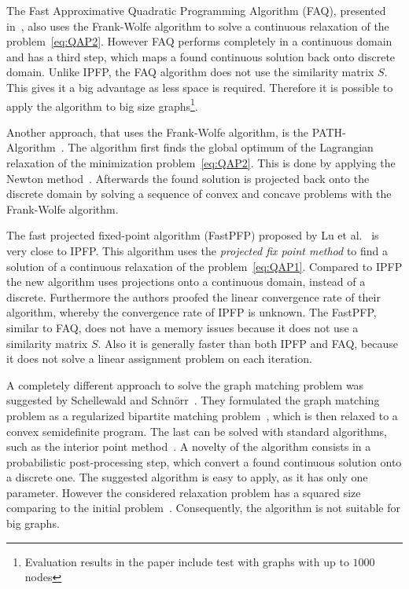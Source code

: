 The Fast Approximative Quadratic Programming Algorithm (FAQ), presented in~\cite{Vogelstein_BrainGraphs}, also uses the Frank-Wolfe algorithm to solve a continuous relaxation of the problem~\eqref{eq:QAP2}. However FAQ performs completely in a continuous domain and has a third step, which maps a found continuous solution back onto discrete domain. Unlike IPFP, the FAQ algorithm does not use the similarity matrix $S$. This gives it a big advantage as less space is required. Therefore it is possible to apply the algorithm to big size graphs\footnote{Evaluation results in the paper include test with graphs with up to $1000$ nodes}. 

Another approach, that uses the Frank-Wolfe algorithm, is the PATH-Algorithm~\cite{Zazlavskiy2008_PATH}. The algorithm first finds the global optimum of the Lagrangian relaxation of the minimization problem~\eqref{eq:QAP2}. This is done by applying the Newton method~\cite{Book_ConvOpt}. Afterwards the found solution is projected back onto the discrete domain by solving a sequence of convex and concave problems with the Frank-Wolfe algorithm.

The fast projected fixed-point algorithm (FastPFP) proposed by Lu et al.~\cite{FastPFP} is very close to IPFP. This algorithm uses the \emph{projected fix point method} to find a solution of a continuous relaxation of the problem~\eqref{eq:QAP1}. Compared to IPFP the new algorithm uses projections onto a continuous domain, instead of a discrete. Furthermore the authors proofed the linear convergence rate of their algorithm, whereby the convergence rate of IPFP is unknown. The FastPFP, similar to FAQ, does not have a memory issues because it does not use a similarity matrix $S$. Also it is generally faster than both IPFP and FAQ, because it does not solve a linear assignment problem on each iteration.

A completely different approach to solve the graph matching problem was suggested by Schellewald and Schn\"orr~\cite{Schellewald2005}. They formulated the graph matching problem as a regularized bipartite matching problem~\cite{Diestel2000}, which is then relaxed to a convex semidefinite program. The last can be solved with standard algorithms, such as the interior point method~\cite{Book_ConvOpt}. A novelty of the algorithm consists in a probabilistic post-processing step, which convert a found continuous solution  onto a discrete one. The suggested algorithm is easy to apply, as it has only one parameter. However the considered relaxation problem has a squared size comparing to the initial problem~\cite{Cour2006}. Consequently, the algorithm is not suitable for big graphs.
